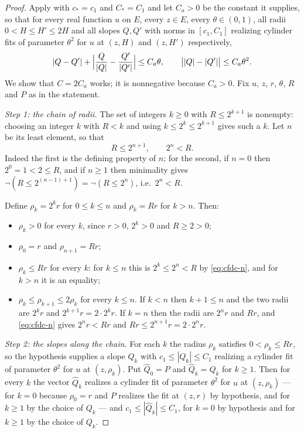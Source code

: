 \begin{proof}
Apply  with $c_*=c_1$ and $C_*=C_1$ and let
$C_a>0$ be the constant it supplies, so that for every real function $u$ on $E$, every
$z\in E$, every $\theta\in(0,1)$, all radii $0<H\le H'\le2H$ and all slopes $Q,Q'$ with
norms in $[c_1,C_1]$ realizing cylinder fits of parameter $\theta^2$ for $u$ at $(z,H)$
and $(z,H')$ respectively,
\begin{equation}\label{eq:cfdc-link}
  |Q-Q'|+\Bigl|\frac{Q}{|Q|}-\frac{Q'}{|Q'|}\Bigr|\le C_a\theta,
  \qquad \bigl||Q|-|Q'|\bigr|\le C_a\theta^2 .
\end{equation}
We show that $C=2C_a$ works; it is nonnegative because $C_a>0$. Fix $u$, $z$, $r$,
$\theta$, $R$ and $P$ as in the statement.

\emph{Step 1: the chain of radii.}
The set of integers $k\ge0$ with $R\le2^{k+1}$ is nonempty: choosing an integer $k$
with $R<k$ and using $k\le2^k\le2^{k+1}$ gives such a $k$. Let $n$ be its least
element, so that
\begin{equation}\label{eq:cfdc-n}
  R\le2^{n+1},\qquad 2^n<R .
\end{equation}
Indeed the first is the defining property of $n$; for the second, if $n=0$ then
$2^0=1<2\le R$, and if $n\ge1$ then minimality gives $\neg(R\le2^{(n-1)+1})=\neg(R\le2^n)$,
i.e.\ $2^n<R$.

Define $\rho_k=2^kr$ for $0\le k\le n$ and $\rho_k=Rr$ for $k>n$. Then:
\begin{itemize}
\item $\rho_k>0$ for every $k$, since $r>0$, $2^k>0$ and $R\ge2>0$;
\item $\rho_0=r$ and $\rho_{n+1}=Rr$;
\item $\rho_k\le Rr$ for every $k$: for $k\le n$ this is $2^k\le2^n<R$ by
\eqref{eq:cfdc-n}, and for $k>n$ it is an equality;
\item $\rho_k\le\rho_{k+1}\le2\rho_k$ for every $k\le n$. If $k<n$ then $k+1\le n$ and
the two radii are $2^kr$ and $2^{k+1}r=2\cdot2^kr$. If $k=n$ then the radii are $2^nr$
and $Rr$, and \eqref{eq:cfdc-n} gives $2^nr<Rr$ and $Rr\le2^{n+1}r=2\cdot2^nr$.
\end{itemize}

\emph{Step 2: the slopes along the chain.}
For each $k$ the radius $\rho_k$ satisfies $0<\rho_k\le Rr$, so the hypothesis supplies
a slope $Q_k$ with $c_1\le|Q_k|\le C_1$ realizing a cylinder fit of parameter
$\theta^2$ for $u$ at $(z,\rho_k)$. Put $\widehat Q_0=P$ and $\widehat Q_k=Q_k$ for
$k\ge1$. Then for every $k$ the vector $\widehat Q_k$ realizes a cylinder fit of
parameter $\theta^2$ for $u$ at $(z,\rho_k)$ --- for $k=0$ because $\rho_0=r$ and $P$
realizes the fit at $(z,r)$ by hypothesis, and for $k\ge1$ by the choice of $Q_k$ ---
and $c_1\le|\widehat Q_k|\le C_1$, for $k=0$ by hypothesis and for $k\ge1$ by the
choice of $Q_k$.


\end{proof}
